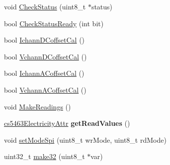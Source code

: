 \begin{DoxyCompactItemize}
\item 
void \hyperlink{classcs5463spi_a3dca190be7b9d15e5f224caabf3ea356}{Check\-Status} (uint8\-\_\-t $\ast$status)
\item 
bool \hyperlink{classcs5463spi_af8e47c4b7ef0aa7f37e4ddedb6545508}{Check\-Status\-Ready} (int bit)
\item 
bool \hyperlink{classcs5463spi_a6607917b066f2e6733bc4b46c13af61c}{Ichann\-D\-Coffset\-Cal} ()
\item 
bool \hyperlink{classcs5463spi_a51236d9b55605eeba87c7f016b1bcf55}{Vchann\-D\-Coffset\-Cal} ()
\item 
bool \hyperlink{classcs5463spi_a825ab80592f6d90501c5f4d83977ded5}{Ichann\-A\-Coffset\-Cal} ()
\item 
bool \hyperlink{classcs5463spi_a6fdc28d935e69c70eb844c030e73654a}{Vchann\-A\-Coffset\-Cal} ()
\item 
void \hyperlink{classcs5463spi_a9213fc3397234424ce5c62dc5b13e634}{Make\-Readings} ()
\item 
\hypertarget{classcs5463spi_a7fbf4a5fbc7f415afcc74a265883c674}{\hyperlink{structcs5463ElectricityAttr}{cs5463\-Electricity\-Attr} {\bfseries get\-Read\-Values} ()}\label{classcs5463spi_a7fbf4a5fbc7f415afcc74a265883c674}

\item 
void \hyperlink{classcs5463spi_a166fefb7fbb67b265dffc6c9c07ef96b}{set\-Mode\-Spi} (uint8\-\_\-t wr\-Mode, uint8\-\_\-t rd\-Mode)
\item 
uint32\-\_\-t \hyperlink{classcs5463spi_aa85ec2bd59b4fc80c7dc59812e6d186e}{make32} (uint8\-\_\-t $\ast$var)
\end{DoxyCompactItemize}
